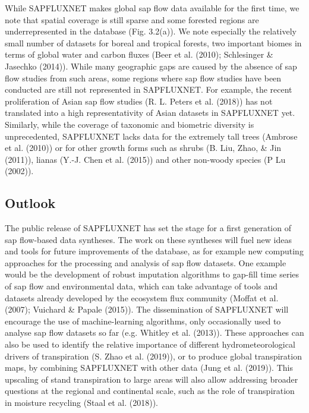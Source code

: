 \documentclass[11pt,twoside]{reedthesis}
\begin{document}
While SAPFLUXNET makes global sap flow data available for the first
time, we note that spatial coverage is still sparse and some forested
regions are underrepresented in the database (Fig. 3.2(a)). We note
especially the relatively small number of datasets for boreal and
tropical forests, two important biomes in terms of global water and
carbon fluxes (Beer et al. (2010); Schlesinger \& Jasechko (2014)).
While many geographic gaps are caused by the absence of sap flow studies
from such areas, some regions where sap flow studies have been conducted
are still not represented in SAPFLUXNET. For example, the recent
proliferation of Asian sap flow studies (R. L. Peters et al. (2018)) has
not translated into a high representativity of Asian datasets in
SAPFLUXNET yet. Similarly, while the coverage of taxonomic and biometric
diversity is unprecedented, SAPFLUXNET lacks data for the extremely tall
trees (Ambrose et al. (2010)) or for other growth forms such as shrubs
(B. Liu, Zhao, \& Jin (2011)), lianas (Y.-J. Chen et al. (2015)) and
other non-woody species (P Lu (2002)).\par

\subsection{Outlook}\label{outlook}

The public release of SAPFLUXNET has set the stage for a first
generation of sap flow-based data syntheses. The work on these syntheses
will fuel new ideas and tools for future improvements of the database,
as for example new computing approaches for the processing and analysis
of sap flow datasets. One example would be the development of robust
imputation algorithms to gap-fill time series of sap flow and
environmental data, which can take advantage of tools and datasets
already developed by the ecosystem flux community (Moffat et al. (2007);
Vuichard \& Papale (2015)). The dissemination of SAPFLUXNET will
encourage the use of machine-learning algorithms, only occasionally used
to analyse sap flow datasets so far (e.g. Whitley et al. (2013)). These
approaches can also be used to identify the relative importance of
different hydrometeorological drivers of transpiration (S. Zhao et al.
(2019)), or to produce global transpiration maps, by combining
SAPFLUXNET with other data (Jung et al. (2019)). This upscaling of stand
transpiration to large areas will also allow addressing broader
questions at the regional and continental scale, such as the role of
transpiration in moisture recycling (Staal et al. (2018)).\par
\end{document}
